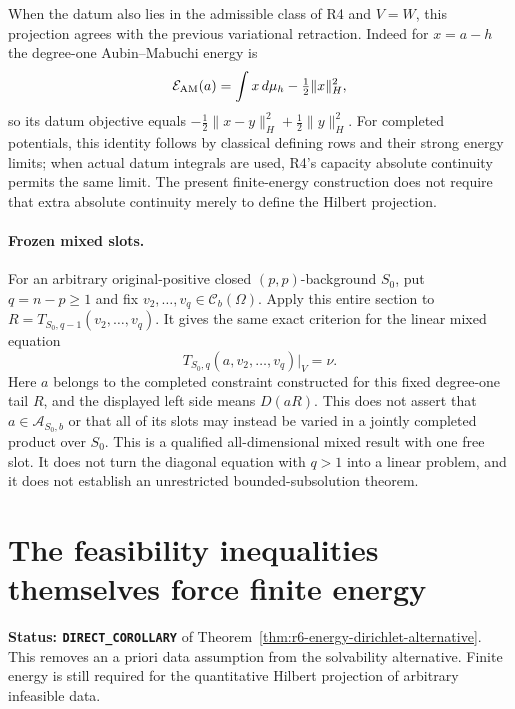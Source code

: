 \documentclass[11pt,a4paper]{article}
\numberwithin{equation}{section}
\theoremstyle{definition}
\theoremstyle{remark}
\begin{document}
When the datum also lies in the admissible class of R4 and $V=W$, this
projection agrees with the previous variational retraction. Indeed for
$x=a-h$ the degree-one Aubin--Mabuchi energy is
\[
 \mathcal E_{\rm AM}(a)=\int x\,d\mu_h-\tfrac12\|x\|_H^2,
\]
so its datum objective equals
$-\tfrac12\|x-y\|_H^2+\tfrac12\|y\|_H^2$.
For completed potentials, this identity follows by classical defining
rows and their strong energy limits; when actual datum integrals are
used, R4's capacity absolute continuity permits the same limit.
The present finite-energy construction does not require that extra
absolute continuity merely to define the Hilbert projection.

\paragraph{Frozen mixed slots.}
For an arbitrary original-positive closed $(p,p)$-background $S_0$,
put $q=n-p\ge1$ and fix $v_2,\ldots,v_q\in\mathcal C_b(\Omega)$.
Apply this entire section to
$R=T_{S_0,q-1}(v_2,\ldots,v_q)$. It gives the same exact criterion for
the linear mixed equation
\[
          T_{S_0,q}(a,v_2,\ldots,v_q)|_V=\nu.
\]
Here $a$ belongs to the completed constraint constructed for this fixed
degree-one tail $R$, and the displayed left side means $D(aR)$.
This does not assert that $a\in\mathcal A_{S_0,b}$ or that all of its
slots may instead be varied in a jointly completed product over $S_0$.
This is a qualified all-dimensional mixed result with one free slot.
It does not turn the diagonal equation with $q>1$ into a linear problem,
and it does not establish an unrestricted bounded-subsolution theorem.



\section{The feasibility inequalities themselves force finite energy}
\label{sec:r6-general-data-alternative}

\noindent\textbf{Status: \texttt{DIRECT\_COROLLARY}} of
Theorem~\ref{thm:r6-energy-dirichlet-alternative}. This removes an a
priori data assumption from the solvability alternative. Finite energy
is still required for the quantitative Hilbert projection of arbitrary
infeasible data.
\end{document}
